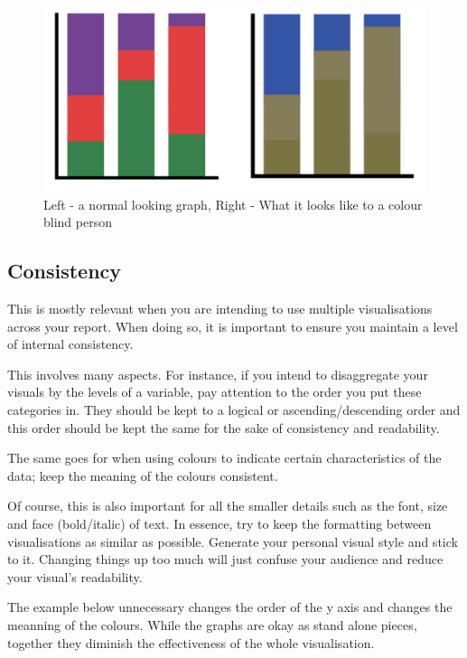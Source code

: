 \documentclass[
  titlepage]{book}
\begin{document}
\begin{figure}
\centering
\includegraphics{img/colour blind comine.png}
\caption{Left - a normal looking graph, Right - What it looks like to a colour blind person}
\end{figure}

\hypertarget{consistency}{%
\subsection{Consistency}\label{consistency}}

This is mostly relevant when you are intending to use multiple visualisations across your report. When doing so, it is important to ensure you maintain a level of internal consistency.

This involves many aspects. For instance, if you intend to disaggregate your visuals by the levels of a variable, pay attention to the order you put these categories in. They should be kept to a logical or ascending/descending order and this order should be kept the same for the sake of consistency and readability.

The same goes for when using colours to indicate certain characteristics of the data; keep the meaning of the colours consistent.

Of course, this is also important for all the smaller details such as the font, size and face (bold/italic) of text. In essence, try to keep the formatting between visualisations as similar as possible. Generate your personal visual style and stick to it. Changing things up too much will just confuse your audience and reduce your visual's readability.

The example below unnecessary changes the order of the y axis and changes the meanning of the colours. While the graphs are okay as stand alone pieces, together they diminish the effectiveness of the whole visualisation.
\end{document}
